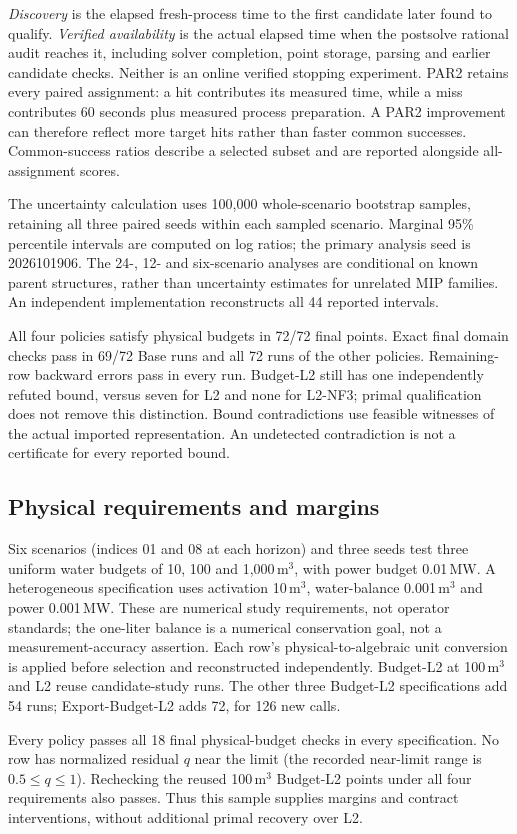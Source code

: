 \emph{Discovery} is the elapsed fresh-process time to the first candidate later
found to qualify. \emph{Verified availability} is the actual elapsed time when
the postsolve rational audit reaches it, including solver completion, point
storage, parsing and earlier candidate checks. Neither is an online verified
stopping experiment. PAR2 retains every paired assignment: a hit contributes
its measured time, while a miss contributes 60 seconds plus measured process
preparation. A PAR2 improvement can therefore reflect more target hits rather
than faster common successes. Common-success ratios describe a selected subset
and are reported alongside all-assignment scores.

The uncertainty calculation uses 100,000 whole-scenario bootstrap samples,
retaining all three paired seeds within each sampled scenario. Marginal 95\%
percentile intervals are computed on log ratios; the primary analysis seed is
2026101906. The 24-, 12- and six-scenario analyses are conditional on known
parent structures, rather than uncertainty estimates for unrelated MIP families.
An independent implementation reconstructs all 44 reported intervals.


All four policies satisfy physical budgets in 72/72 final points. Exact final
domain checks pass in 69/72 Base runs and all 72 runs of the other policies.
Remaining-row backward errors pass in every run. Budget-L2 still has one
independently refuted bound, versus seven for L2 and none for L2-NF3; primal
qualification does not remove this distinction. Bound contradictions use feasible
witnesses of the actual imported representation. An undetected contradiction is
not a certificate for every reported bound.

\subsection{Physical requirements and margins}
Six scenarios (indices 01 and 08 at each horizon) and three seeds test three
uniform water budgets of 10, 100 and 1,000\,m$^3$, with power budget 0.01\,MW.
A heterogeneous specification uses activation 10\,m$^3$, water-balance
0.001\,m$^3$ and power 0.001\,MW. These are numerical study requirements, not
operator standards; the one-liter balance is a numerical conservation goal,
not a measurement-accuracy assertion. Each row's physical-to-algebraic unit
conversion is applied before selection and reconstructed independently.
Budget-L2 at 100\,m$^3$ and L2 reuse candidate-study runs. The other three
Budget-L2 specifications add 54 runs; Export-Budget-L2 adds 72, for 126 new calls.

Every policy passes all 18 final physical-budget checks in every specification.
No row has normalized residual $q$ near the limit (the recorded near-limit range
is $0.5\le q\le1$). Rechecking the reused 100\,m$^3$ Budget-L2 points under all
four requirements also passes. Thus this sample supplies margins and contract
interventions, without additional primal recovery over L2.

